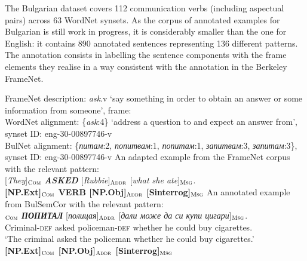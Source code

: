 \documentclass[output=paper,colorlinks,citecolor=brown]{langscibook}
\begin{document}
The Bulgarian dataset covers 112 communication verbs (including aspectual pairs) across 63 WordNet synsets. As the corpus of annotated examples for Bulgarian is still work in progress, it is considerably smaller than the one for English: it contains 890 annotated sentences representing 136 different patterns. The annotation consists in labelling the sentence components with the frame elements they realise in a way consistent with the annotation in the Berkeley FrameNet. 

\begin{exe}
\ex \label{ex:annotation}
\begin{xlist}
\ex 
\glt FrameNet description: \textit{ask}.v `say something in order to obtain an answer or some information from someone', frame: \\
WordNet alignment: \{\textit{ask}:4\} `address a question to and expect an answer from', synset ID: eng-30-00897746-v\\
BulNet alignment: \{\textit{питам}:2, \textit{попитвам}:1, \textit{попитам}:1, \textit{запитвам}:3, \textit{запитам}:3\}, synset ID: eng-30-00897746-v
\ex An adapted example from the FrameNet corpus with the relevant pattern:\\ 
{[\textit{They}]}$_{\text{\textsc{Com}}}$  \textit{\textbf{ASKED}} [\textit{Rubbie}]$_{\text{\textsc{Addr}}}$ [\textit{what she ate}]$_{\text{\textsc{Msg}}}$.\\
\textbf{{[NP.Ext]}$_{\text{\textsc{Com}}}$ VERB {[NP.Obj]}$_{\text{\textsc{Addr}}}$ {[Sinterrog]}$_{\text{\textsc{Msg}}}$}
\ex An annotated example from BulSemCor with the relevant pattern:\\
$_{\text{\textsc{Com}}}$ \textit{\textbf{ПОПИТАЛ}} [\textit{полицая}]$_{\text{\textsc{Addr}}}$ [\textit{дали може да си купи цигари}]$_{\text{\textsc{Msg}}}$.\\
Criminal-\textsc{def} asked policeman-\textsc{def} {whether he could buy cigarettes}.\\
\glt `The criminal asked the policeman whether he could buy cigarettes.'\\
\textbf{{[NP.Ext]}$_{\text{\textsc{Com}}}$ {[NP.Obj]}$_{\text{\textsc{Addr}}}$ {[Sinterrog]}$_{\text{\textsc{Msg}}}$} 
\end{xlist}
\end{exe} 


\end{document}
